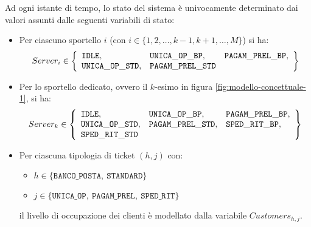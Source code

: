 Ad ogni istante di tempo, lo stato del sistema è univocamente determinato dai valori assunti dalle seguenti variabili di stato:
\begin{itemize}
\item Per ciascuno sportello $i$ (con $i \in \lbrace 1, 2, \dots, k-1, k+1, \dots, M \rbrace$) si ha:
\begin{equation}
Server_i \in
\left\lbrace
\begin{array}{l l l}
\mathtt{IDLE}, & \mathtt{UNICA\_OP\_BP}, & \mathtt{PAGAM\_PREL\_BP},\\ 
\mathtt{UNICA\_OP\_STD}, & \mathtt{PAGAM\_PREL\_STD}
\end{array}
\right\rbrace
\end{equation}
\item Per lo sportello dedicato, ovvero il $k$-esimo in figura \ref{fig:modello-concettuale-1}, si ha:
\begin{equation}
Server_k \in 
\left\lbrace
\begin{array}{l l l}
\mathtt{IDLE}, & \mathtt{UNICA\_OP\_BP}, & \mathtt{PAGAM\_PREL\_BP},\\ 
\mathtt{UNICA\_OP\_STD}, & \mathtt{PAGAM\_PREL\_STD}, & \mathtt{SPED\_RIT\_BP},\\\mathtt{SPED\_RIT\_STD}
\end{array}
\right\rbrace
\end{equation}
\item Per ciascuna tipologia di ticket $(h, j)$ con:
\begin{itemize}
\item $h \in \lbrace \mathtt{BANCO\_POSTA},\ \mathtt{STANDARD}\rbrace$
\item $j \in \lbrace \mathtt{UNICA\_OP},\ \mathtt{PAGAM\_PREL},\ \mathtt{SPED\_RIT} \rbrace$
\end{itemize}
il livello di occupazione dei clienti è modellato dalla variabile $Customers_{h,j}$.
\end{itemize}

